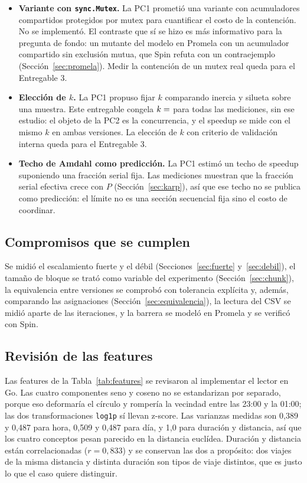 \begin{itemize}
  \item \textbf{Variante con \texttt{sync.Mutex}.} La PC1 prometió una variante con acumuladores
        compartidos protegidos por mutex para cuantificar el costo de la contención. No se
        implementó. El contraste que sí se hizo es más informativo para la pregunta de fondo: un
        mutante del modelo en Promela con un acumulador compartido sin exclusión mutua, que Spin
        refuta con un contraejemplo (Sección~\ref{sec:promela}). Medir la contención de un mutex real
        queda para el Entregable 3.
  \item \textbf{Elección de $k$.} La PC1 propuso fijar $k$ comparando inercia y silueta sobre una
        muestra. Este entregable congela $k = \cifra{k}$ para todas las mediciones, sin ese estudio:
        el objeto de la PC2 es la concurrencia, y el speedup se mide con el mismo $k$ en ambas
        versiones. La elección de $k$ con criterio de validación interna queda para el Entregable 3.
  \item \textbf{Techo de Amdahl como predicción.} La PC1 estimó un techo de speedup suponiendo una
        fracción serial fija. Las mediciones muestran que la fracción serial efectiva crece con $P$
        (Sección~\ref{sec:karp}), así que ese techo no se publica como predicción: el límite no es
        una sección secuencial fija sino el costo de coordinar.
\end{itemize}

\subsection{Compromisos que se cumplen}

Se midió el escalamiento fuerte y el débil (Secciones~\ref{sec:fuerte} y~\ref{sec:debil}), el
tamaño de bloque se trató como variable del experimento (Sección~\ref{sec:chunk}), la equivalencia
entre versiones se comprobó con tolerancia explícita y, además, comparando las asignaciones
(Sección~\ref{sec:equivalencia}), la lectura del CSV se midió aparte de las iteraciones, y la
barrera se modeló en Promela y se verificó con Spin.

\subsection{Revisión de las features}

Las features de la Tabla~\ref{tab:features} se revisaron al implementar el lector en Go. Las cuatro
componentes seno y coseno no se estandarizan por separado, porque eso deformaría el círculo y
rompería la vecindad entre las 23:00 y la 01:00; las dos transformaciones \texttt{log1p} sí llevan
z-score. Las varianzas medidas son 0,389 y 0,487 para hora, 0,509 y 0,487 para día, y 1,0 para
duración y distancia, así que los cuatro conceptos pesan parecido en la distancia euclídea. Duración y
distancia están correlacionadas ($r = 0{,}833$) y se conservan las dos a propósito: dos viajes de la
misma distancia y distinta duración son tipos de viaje distintos, que es justo lo que el caso quiere
distinguir.

